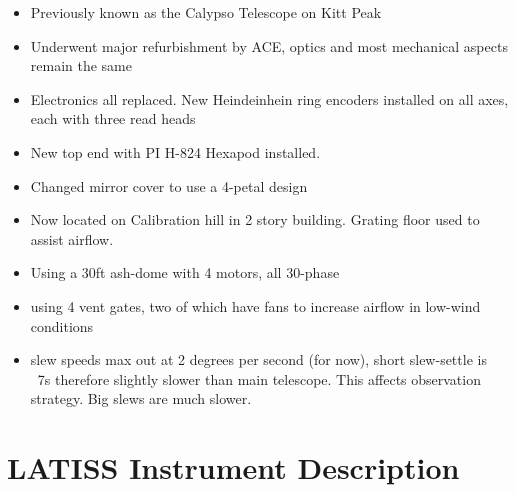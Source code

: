 \begin{itemize}
	\item Previously known as the Calypso Telescope on Kitt Peak
	\item Underwent major refurbishment by ACE, optics and most mechanical aspects remain the same
	\item Electronics all replaced. New Heindeinhein ring encoders installed on all axes, each with three read heads
	\item New top end with PI H-824 Hexapod installed. 
	\item Changed mirror cover to use a 4-petal design
	\item Now located on Calibration hill in 2 story building. Grating floor used to assist airflow.
	\item Using a 30ft ash-dome with 4 motors, all 30-phase
	\item using 4 vent gates, two of which have fans to increase airflow in low-wind conditions
	\item slew speeds max out at 2 degrees per second (for now), short slew-settle is ~7s therefore slightly slower than main telescope. This affects observation strategy. Big slews are much slower.
\end{itemize} 
 
\section{LATISS Instrument Description} 

